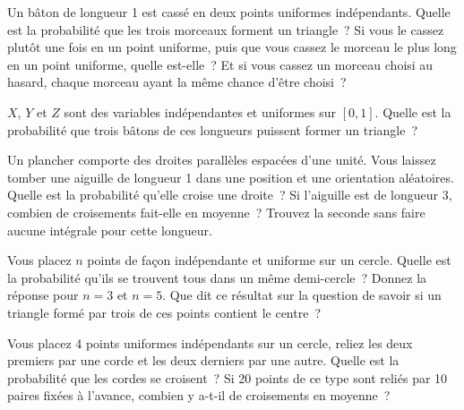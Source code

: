 \begin{question}\label{iq:iv1:continuous-and-geometric-probability:6}
Un bâton de longueur 1 est cassé en deux points uniformes indépendants. Quelle est la probabilité que les trois morceaux forment un triangle~? Si vous le cassez plutôt une fois en un point uniforme, puis que vous cassez le morceau le plus long en un point uniforme, quelle est-elle~? Et si vous cassez un morceau choisi au hasard, chaque morceau ayant la même chance d'être choisi~?
\end{question}

\begin{question}\label{iq:iv1:continuous-and-geometric-probability:7}
$X$, $Y$ et $Z$ sont des variables indépendantes et uniformes sur $[0, 1]$. Quelle est la probabilité que trois bâtons de ces longueurs puissent former un triangle~?
\end{question}

\begin{question}\label{iq:iv1:continuous-and-geometric-probability:8}
Un plancher comporte des droites parallèles espacées d'une unité. Vous laissez tomber une aiguille de longueur 1 dans une position et une orientation aléatoires. Quelle est la probabilité qu'elle croise une droite~? Si l'aiguille est de longueur 3, combien de croisements fait-elle en moyenne~? Trouvez la seconde sans faire aucune intégrale pour cette longueur.
\end{question}

\begin{question}\label{iq:iv1:continuous-and-geometric-probability:9}
Vous placez $n$ points de façon indépendante et uniforme sur un cercle. Quelle est la probabilité qu'ils se trouvent tous dans un même demi-cercle~? Donnez la réponse pour $n = 3$ et $n = 5$. Que dit ce résultat sur la question de savoir si un triangle formé par trois de ces points contient le centre~?
\end{question}

\begin{question}\label{iq:iv1:continuous-and-geometric-probability:10}
Vous placez 4 points uniformes indépendants sur un cercle, reliez les deux premiers par une corde et les deux derniers par une autre. Quelle est la probabilité que les cordes se croisent~? Si 20 points de ce type sont reliés par 10 paires fixées à l'avance, combien y a-t-il de croisements en moyenne~?
\end{question}

